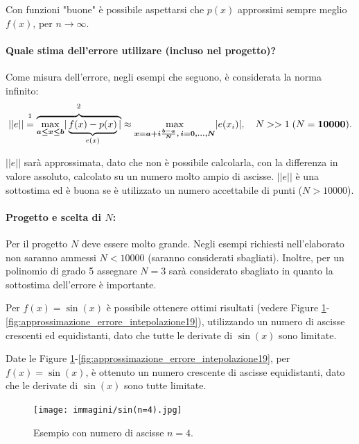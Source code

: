 Con funzioni "buone" è possibile aspettarsi che $p(x)$ approssimi sempre meglio $f(x)$, per $n\rightarrow\infty$.

\paragraph{Quale stima dell'errore utilizare (incluso nel progetto)?}Come misura dell'errore, negli esempi che seguono, è considerata la norma infinito:
\begin{equation*}
    ||e||\overset{\footnotemark}{=} \overbrace{\underset{\boldsymbol{a\leq x\leq b}}{\max}|\underbrace{f(x)-p(x)}_{e(x)}|}^{\footnotemark}\approx \underset{\boldsymbol{x=a+i\frac{b-a}{N},\, i=0,\hdots,N}}{\max}|e(x_i)|,\quad N>>1\; (N=\boldsymbol{10000}).
\end{equation*}
\addtocounter{footnote}{-1}

$||e||$ sarà approssimata, dato che non è possibile calcolarla, con la differenza in valore assoluto, calcolato su un numero molto ampio di ascisse. $||e||$ è una sottostima ed è buona se è utilizzato un numero accettabile di punti ($N>10000$).

\paragraph{Progetto e scelta di $N$:} Per il progetto $N$ deve essere molto grande. Negli esempi richiesti nell'elaborato non saranno ammessi $N<10000$ (saranno considerati sbagliati). Inoltre, per un polinomio di grado 5 assegnare $N=3$ sarà considerato sbagliato in quanto la sottostima dell'errore è importante.

\begin{example}
    Per $f(x)=\sin(x)$ è possibile ottenere ottimi risultati (vedere Figure \ref{fig:approxErrIntepolaz4}-\ref{fig:approssimazione_errore_intepolazione19}), utilizzando un numero di ascisse crescenti ed equidistanti, dato che tutte le derivate di $\sin(x)$ sono limitate.

    Date le Figure \ref{fig:approxErrIntepolaz4}-\ref{fig:approssimazione_errore_intepolazione19}, per $f(x)=\sin(x)$, è ottenuto un numero crescente di ascisse equidistanti, dato che le derivate di $\sin(x)$ sono tutte limitate.
\end{example}

\begin{figure}%
\centering
\texttt{[image: immagini/sin(n=4).jpg]}
\caption{Esempio con numero di ascisse $n=4$.}\label{fig:approxErrIntepolaz4}
\end{figure}


